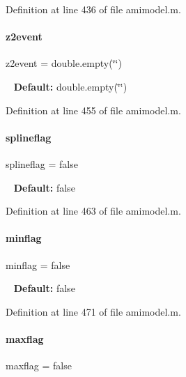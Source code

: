 Definition at line 436 of file amimodel.\+m.

\mbox{\label{classamimodel_a7a7be015feeb7a346dceccd49e622b4b}} 
\paragraph{\texorpdfstring{z2event}{z2event}}
{\footnotesize\ttfamily z2event = double.\+empty(\char`\"{}\char`\"{})}

~\newline
{\bfseries Default\+:} double.\+empty(\char`\"{}\char`\"{}) 

Definition at line 455 of file amimodel.\+m.

\mbox{\label{classamimodel_abea45d67286ebbf35dcbc12e335ffd51}} 
\paragraph{\texorpdfstring{splineflag}{splineflag}}
{\footnotesize\ttfamily splineflag = false}

~\newline
{\bfseries Default\+:} false 

Definition at line 463 of file amimodel.\+m.

\mbox{\label{classamimodel_affead4b7a87bc135fea91fd5aada78a8}} 
\paragraph{\texorpdfstring{minflag}{minflag}}
{\footnotesize\ttfamily minflag = false}

~\newline
{\bfseries Default\+:} false 

Definition at line 471 of file amimodel.\+m.

\mbox{\label{classamimodel_a1a65e7157ae2262cfa11a783b018364f}} 
\paragraph{\texorpdfstring{maxflag}{maxflag}}
{\footnotesize\ttfamily maxflag = false}

